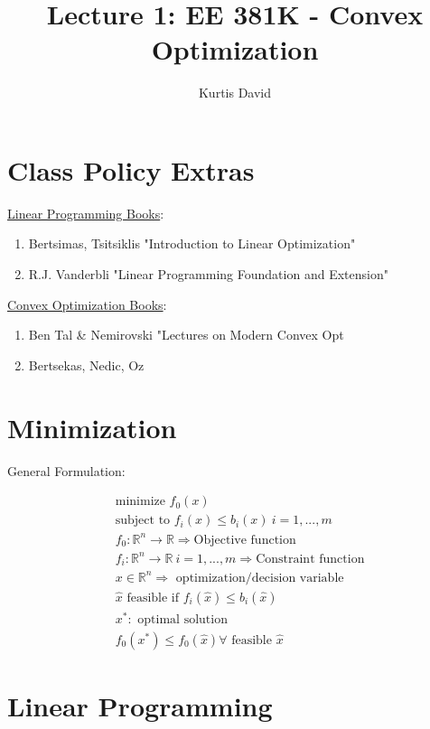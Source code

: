 \documentclass[psamsfonts, 12pt]{amsart}
\theoremstyle{definition}
\theoremstyle{remark}
\newcommand{\R}{\mathbb{R}}
\begin{document}
%
\author{Kurtis David}
%
\title{Lecture 1: EE 381K - Convex Optimization}
%
\maketitle
%

\section{Class Policy Extras}

\underline{Linear Programming Books}:

\begin{enumerate}
    \item Bertsimas, Tsitsiklis "Introduction to Linear Optimization"
    \item R.J. Vanderbli "Linear Programming Foundation and Extension"
\end{enumerate}

\underline{Convex Optimization Books}:

\begin{enumerate}
    \item Ben Tal \& Nemirovski "Lectures on Modern Convex Opt
    \item Bertsekas, Nedic, Oz
\end{enumerate}

\section{Minimization}

General Formulation:

\begin{align*}
    &\text{minimize }f_0(x) \\
    &\text{subject to } f_i(x) \leq b_i(x)\ i = 1,...,m \\
    &f_0: \R^n \rightarrow \R \Rightarrow \text{Objective function} \\
    &f_i: \R^n \rightarrow \R\ i=1,...,m \Rightarrow  \text{Constraint function} \\
    &x \in \R^n \Rightarrow \text{ optimization/decision variable} \\
    &\hat{x}  \text{ feasible if } f_i(\hat{x}) \leq b_i(\hat{x})\\
    &x^*: \text{ optimal solution}\\
    &f_0(x^*) \leq f_0(\hat{x}) \forall \text{ feasible } \hat{x}
\end{align*}

\section{Linear Programming}
\end{document}
